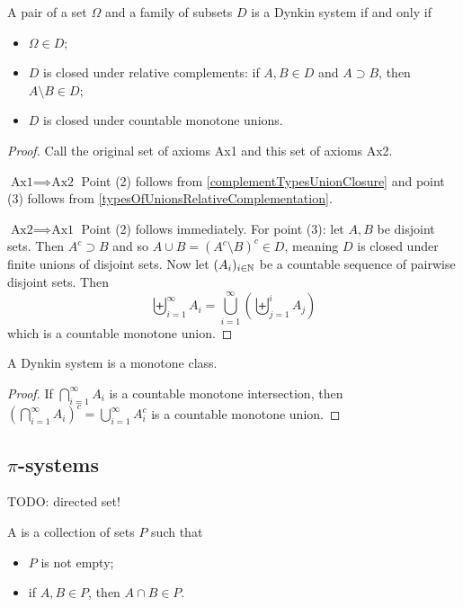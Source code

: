\begin{lemma}
A pair of a set $\Omega$ and a family of subsets $D$ is a Dynkin system \textup{if and only if}
\begin{itemize}
\item $\Omega\in D$;
\item $D$ is closed under relative complements: if $A,B\in D$ and $A\supset B$, then $A\setminus B\in D$;
\item $D$ is closed under countable monotone unions.
\end{itemize}
\end{lemma}
\begin{proof}
Call the original set of axioms Ax1 and this set of axioms Ax2.

$\boxed{\text{Ax1}\implies\text{Ax2}}$ Point (2) follows from \ref{complementTypesUnionClosure} and point (3) follows from \ref{typesOfUnionsRelativeComplementation}.

$\boxed{\text{Ax2}\implies\text{Ax1}}$ Point (2) follows immediately. For point (3): let $A,B$ be disjoint sets. Then $A^c \supset B$ and so $A\cup B = (A^c\setminus B)^c \in D$, meaning $D$ is closed under finite unions of disjoint sets. Now let $(A_i)_{i\in\mathbb{N}}$ be a countable sequence of pairwise disjoint sets. Then
\[ \biguplus_{i=1}^\infty A_i = \bigcup_{i=1}^\infty \left(\biguplus_{j=1}^i A_j\right) \]
which is a countable monotone union.
\end{proof}

\begin{lemma}
A Dynkin system is a monotone class.
\end{lemma}
\begin{proof}
If $\bigcap_{i=1}^\infty A_i$ is a countable monotone intersection, then $\left(\bigcap_{i=1}^\infty A_i\right)^c = \bigcup_{i=1}^\infty A_i^c$ is a countable monotone union.
\end{proof}

\subsection{$\pi$-systems}
TODO: directed set!
\begin{definition}
A  is a collection of sets $P$ such that
\begin{itemize}
\item $P$ is not empty;
\item if $A,B\in P$, then $A\cap B\in P$.
\end{itemize}
\end{definition}


